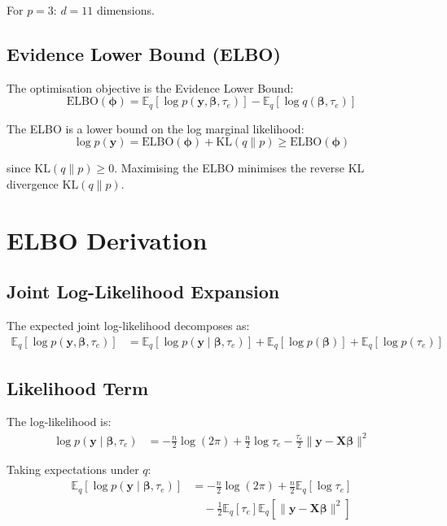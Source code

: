 \documentclass[11pt]{article}
\newcommand{\E}{\mathbb{E}}
\newcommand{\KL}{\text{KL}}
\newcommand{\ELBO}{\text{ELBO}}
\begin{document}
For $p=3$: $d = 11$ dimensions.

\subsection{Evidence Lower Bound (ELBO)}

The optimisation objective is the Evidence Lower Bound:
\begin{equation}
\ELBO(\bm{\phi}) = \E_{q}[\log p(\bm{y}, \bm{\beta}, \tau_e)] - \E_{q}[\log q(\bm{\beta}, \tau_e)]
\label{eq:elbo_def}
\end{equation}

The ELBO is a lower bound on the log marginal likelihood:
\begin{equation}
\log p(\bm{y}) = \ELBO(\bm{\phi}) + \KL(q \| p) \geq \ELBO(\bm{\phi})
\end{equation}

since $\KL(q \| p) \geq 0$. Maximising the ELBO minimises the reverse KL divergence $\KL(q \| p)$.

\section{ELBO Derivation}

\subsection{Joint Log-Likelihood Expansion}

The expected joint log-likelihood decomposes as:
\begin{align}
\E_{q}[\log p(\bm{y}, \bm{\beta}, \tau_e)] &= \E_{q}[\log p(\bm{y} \mid \bm{\beta}, \tau_e)] + \E_{q}[\log p(\bm{\beta})] + \E_{q}[\log p(\tau_e)]
\end{align}

\subsection{Likelihood Term}

The log-likelihood is:
\begin{align}
\log p(\bm{y} \mid \bm{\beta}, \tau_e) &= -\frac{n}{2}\log(2\pi) + \frac{n}{2}\log \tau_e - \frac{\tau_e}{2} \|\bm{y} - \bm{X}\bm{\beta}\|^2
\end{align}

Taking expectations under $q$:
\begin{align}
\E_{q}[\log p(\bm{y} \mid \bm{\beta}, \tau_e)] &= -\frac{n}{2}\log(2\pi) + \frac{n}{2}\E_q[\log \tau_e] \nonumber\\
&\quad - \frac{1}{2}\E_q[\tau_e] \E_q[\|\bm{y} - \bm{X}\bm{\beta}\|^2]
\end{align}
\end{document}
